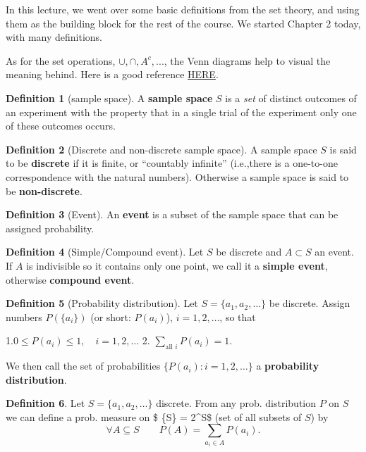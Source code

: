\documentclass[
]{book}
\theoremstyle{definition}
\newtheorem{definition}{Definition}[chapter]
\theoremstyle{definition}
\theoremstyle{definition}
\theoremstyle{definition}
\theoremstyle{remark}
\begin{document}
In this lecture, we went over some basic definitions from the set theory, and using them as the building block for the rest of the course. We started Chapter 2 today, with many definitions.

As for the set operations, \(\cup,\cap,A^c,...\), the Venn diagrams help to visual the meaning behind. Here is a good reference \href{https://www.edrawmax.com/article/venn-diagram-symbols-and-set-notations.html}{HERE}.

\begin{definition}[sample space]
A \textbf{sample space} \(S\) is a \emph{set} of distinct outcomes of an experiment with the property that in a single trial of the experiment only one of these outcomes occurs.
\end{definition}

\begin{definition}[Discrete and non-discrete sample space]
A sample space \(S\) is said to be \textbf{discrete} if it is finite, or ``countably infinite'' (i.e.,there is a one-to-one correspondence with the natural numbers). Otherwise a sample space is said to be \textbf{non-discrete}.
\end{definition}

\begin{definition}[Event]
An \textbf{event} is a subset of the sample space that can be assigned probability.
\end{definition}

\begin{definition}[Simple/Compound event]
Let \(S\) be discrete and \(A\subset S\) an event. If \(A\) is indivisible so it contains only one point, we call it a \textbf{simple event}, otherwise \textbf{compound event}.
\end{definition}

\begin{definition}[Probability distribution]
Let \(S=\{a_1,a_2,\dots\}\) be discrete. Assign numbers \(P(\{a_i\})\) (or short: \(P(a_i)\)), \(i=1,2,\dots\), so that

1.\(0\leq P(a_i)\leq 1,\quad i=1,2,\dots\)
2. \(\sum_{\text{all }i}P(a_i)=1\).

We then call the set of probabilities \(\{P(a_i):i=1,2,\dots\}\) a \textbf{probability distribution}.
\end{definition}

\begin{definition}
Let \(S=\{a_1,a_2,\dots\}\) discrete. From any prob. distribution \(P\) on \(S\) we can define a prob. measure on \$ \{\mathcal S\} = 2\^{}S\$ (set of all subsets of \(S\)) by
\[\forall A \subseteq S \qquad P(A)=\sum_{a_i\in A}P(a_i).\]
\end{definition}
\end{document}
